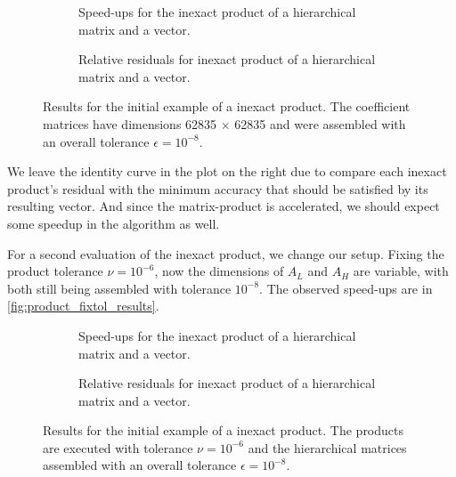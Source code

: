\begin{figure}[h!]
    \centering
    \begin{subfigure}[b]{0.45\linewidth}
        
        \caption{Speed-ups for the inexact product of a hierarchical matrix and a vector.}
    \end{subfigure}
    \begin{subfigure}[b]{0.45\linewidth}
        
        \caption{Relative residuals for inexact product of a hierarchical matrix and a vector.}
    \end{subfigure}
    \caption{Results for the initial example of a inexact product. The coefficient matrices have dimensions 62835 $\times$ 62835 and were assembled with an overall tolerance $\epsilon = 10^{-8}$.}
    \label{fig:product_results}
\end{figure}

We leave the identity curve in the plot on the right due to compare each inexact product's residual with the minimum accuracy that should be satisfied by its resulting vector. And since the matrix-product is accelerated, we should expect some speedup in the algorithm as well.

For a second evaluation of the inexact product, we change our setup. Fixing the product tolerance $\nu=10^{-6}$, now the dimensions of $A_{L}$ and $A_{H}$ are variable, with both still being assembled with tolerance $10^{-8}$. The observed speed-ups are in \autoref{fig:product_fixtol_results}.

\begin{figure}[h!]
    \centering
    \begin{subfigure}[b]{0.45\linewidth}
        
        \caption{Speed-ups for the inexact product of a hierarchical matrix and a vector.}
    \end{subfigure}
    \begin{subfigure}[b]{0.45\linewidth}
        
        \caption{Relative residuals for inexact product of a hierarchical matrix and a vector.}
    \end{subfigure}
    \caption{Results for the initial example of a inexact product. The products are executed with tolerance $\nu=10^{-6}$ and the hierarchical matrices assembled with an overall tolerance $\epsilon = 10^{-8}$.}
    \label{fig:product_fixtol_results}
\end{figure}

